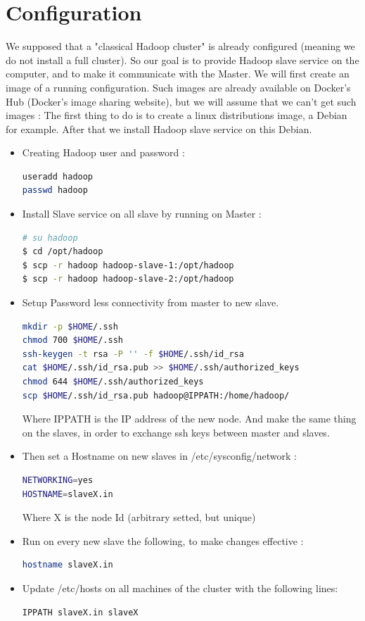 \documentclass[11pt]{report} %
\begin{document}
\section{Configuration}
We supposed that a "classical Hadoop cluster" is already configured (meaning we do not install a full cluster). So our goal is to provide Hadoop slave service on the computer, and to make it communicate with the Master.
We will first create an image of a running configuration. Such images are already available on Docker's Hub (Docker's image sharing website), but we will assume that we can't get such images : 
The first thing to do is to create a linux distributions image, a Debian for example. After that we install Hadoop slave service on this Debian.
\begin{itemize}
\item Creating Hadoop user and password : 

\begin{lstlisting}[language=bash]
useradd hadoop
passwd hadoop
\end{lstlisting}

\item Install Slave service on all slave by running on Master :
\begin{lstlisting}[language=bash]
# su hadoop 
$ cd /opt/hadoop 
$ scp -r hadoop hadoop-slave-1:/opt/hadoop 
$ scp -r hadoop hadoop-slave-2:/opt/hadoop
\end{lstlisting}
\item Setup Password less connectivity from master to new slave.
\begin{lstlisting}[language=bash]
mkdir -p $HOME/.ssh 
chmod 700 $HOME/.ssh 
ssh-keygen -t rsa -P '' -f $HOME/.ssh/id_rsa 
cat $HOME/.ssh/id_rsa.pub >> $HOME/.ssh/authorized_keys 
chmod 644 $HOME/.ssh/authorized_keys
scp $HOME/.ssh/id_rsa.pub hadoop@IPPATH:/home/hadoop/
\end{lstlisting}
Where IPPATH is the IP address of the new node.
And make the same thing on the slaves, in order to exchange ssh keys between master and slaves.

\item Then set a Hostname on new slaves in  /etc/sysconfig/network :
\begin{lstlisting}[language=bash]
NETWORKING=yes 
HOSTNAME=slaveX.in
\end{lstlisting}
Where X is the node Id (arbitrary setted, but unique)

\item Run on every new slave the following, to make changes effective : 
\begin{lstlisting}[language=bash]
hostname slaveX.in
\end{lstlisting}

\item Update /etc/hosts on all machines of the cluster with the following lines:
\begin{lstlisting}[language=bash]
IPPATH slaveX.in slaveX
\end{lstlisting}
\end{itemize}
\end{document}
